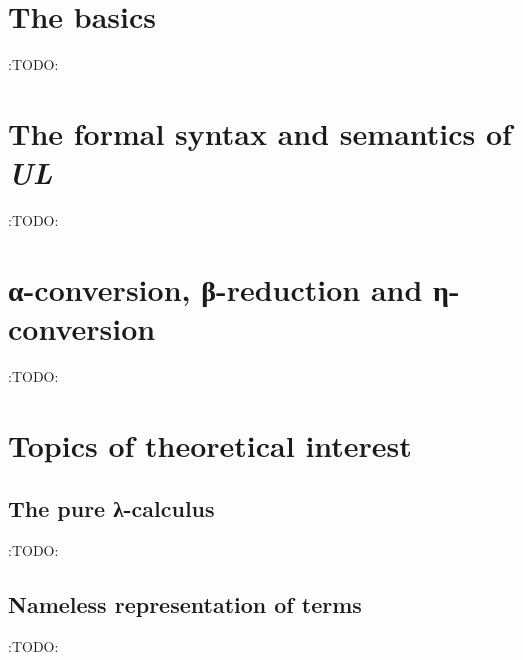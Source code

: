 \documentclass[11pt]{article}
\theoremstyle{definition}
\begin{document}
\section{The basics}
\label{sec:orga07efca}

:TODO:

\section{The formal syntax and semantics of \emph{UL}}
\label{sec:org2c51371}

:TODO:

\section{α-conversion, β-reduction and η-conversion}
\label{sec:org6c76bc4}

:TODO:

\section{Topics of theoretical interest}
\label{sec:org155c890}

\subsection{The pure λ-calculus}
\label{sec:orga6def14}

:TODO:

\subsection{Nameless representation of terms}
\label{sec:orgfb7de8f}

:TODO:
\end{document}
